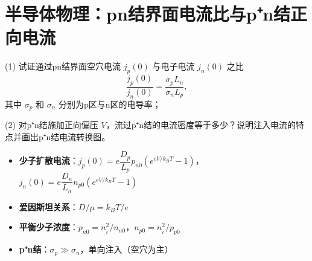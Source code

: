 \section{半导体物理：pn结界面电流比与p⁺n结正向电流}
\label{sec:pn-current-ratio}

\begin{modelbox}
(1) 试证通过pn结界面空穴电流 $j_p(0)$ 与电子电流 $j_n(0)$ 之比
\[
\frac{j_p(0)}{j_n(0)}=\frac{\sigma_pL_n}{\sigma_nL_p},
\]
其中 $\sigma_p$ 和 $\sigma_n$ 分别为p区与n区的电导率；

(2) 对p⁺n结施加正向偏压 $V$，流过p⁺n结的电流密度等于多少？说明注入电流的特点并画出p⁺n结电流转换图。
\end{modelbox}

\begin{tipbox}[考点快速分析]
\begin{itemize}
    \item \textbf{少子扩散电流}：$j_p(0)=e\dfrac{D_p}{L_p}p_{n0}(e^{eV/k_BT}-1)$，$j_n(0)=e\dfrac{D_n}{L_n}n_{p0}(e^{eV/k_BT}-1)$
    \item \textbf{爱因斯坦关系}：$D/\mu=k_BT/e$
    \item \textbf{平衡少子浓度}：$p_{n0}=n_i^2/n_{n0}$，$n_{p0}=n_i^2/p_{p0}$
    \item \textbf{p⁺n结}：$\sigma_p\gg\sigma_n$，单向注入（空穴为主）
\end{itemize}
\end{tipbox}

